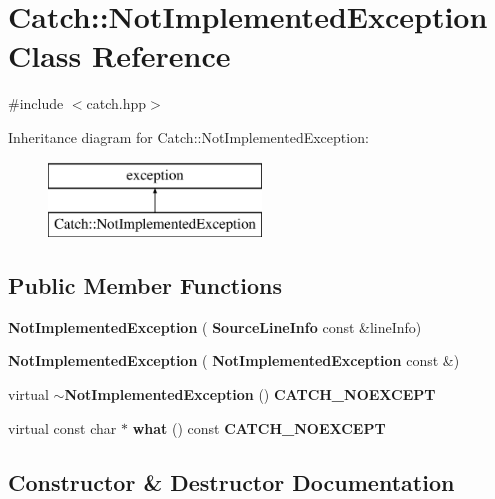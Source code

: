 \section{Catch\+:\+:Not\+Implemented\+Exception Class Reference}
\label{class_catch_1_1_not_implemented_exception}


{\ttfamily \#include $<$catch.\+hpp$>$}

Inheritance diagram for Catch\+:\+:Not\+Implemented\+Exception\+:\begin{figure}[H]
\begin{center}
\leavevmode
\includegraphics[height=2.000000cm]{class_catch_1_1_not_implemented_exception}
\end{center}
\end{figure}
\subsection*{Public Member Functions}
\begin{DoxyCompactItemize}
\item 
\textbf{ Not\+Implemented\+Exception} (\textbf{ Source\+Line\+Info} const \&line\+Info)
\item 
\textbf{ Not\+Implemented\+Exception} (\textbf{ Not\+Implemented\+Exception} const \&)
\item 
virtual \textbf{ $\sim$\+Not\+Implemented\+Exception} () \textbf{ C\+A\+T\+C\+H\+\_\+\+N\+O\+E\+X\+C\+E\+PT}
\item 
virtual const char $\ast$ \textbf{ what} () const \textbf{ C\+A\+T\+C\+H\+\_\+\+N\+O\+E\+X\+C\+E\+PT}
\end{DoxyCompactItemize}


\subsection{Constructor \& Destructor Documentation}
\mbox{\label{class_catch_1_1_not_implemented_exception_ab4f0a5c39d8ffb72c664e2c07e180634}} 
